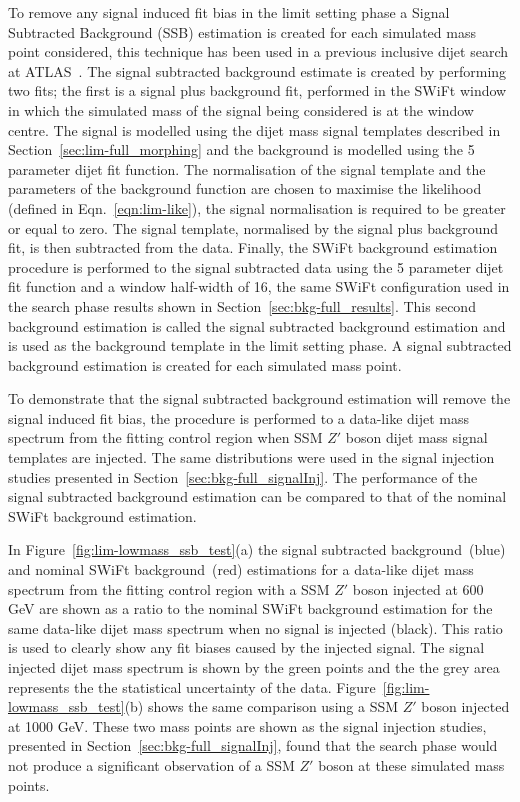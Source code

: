 To remove any signal induced fit bias in the limit setting phase a Signal Subtracted Background (SSB) estimation is
created for each simulated mass point considered, this technique has been used in a previous inclusive dijet search at ATLAS~\cite{dijet-mori17_paper}.
The signal subtracted background estimate is created by performing two fits;
the first is a signal plus background fit, performed in the SWiFt window
in which the simulated mass of the signal being considered is at the window centre.
The signal is modelled using the dijet mass signal templates described in Section~\ref{sec:lim-full_morphing}
and the background is modelled using the 5 parameter dijet fit function.
The normalisation of the signal template and the parameters of the background function are
chosen to maximise the likelihood (defined in Eqn.~\ref{eqn:lim-like}),
the signal normalisation is required to be greater or equal to zero.
The signal template, normalised by the signal plus background fit, is then subtracted from the data.
Finally, the SWiFt background estimation procedure is performed to the signal subtracted data using the 
5 parameter dijet fit function and a window half-width of 16, the same SWiFt configuration used in the search phase results shown in Section~\ref{sec:bkg-full_results}.
This second background estimation is called the signal subtracted background estimation and is used as the background template in the limit setting phase.
A signal subtracted background estimation is created for each simulated mass point.

To demonstrate that the signal subtracted background estimation will remove the signal induced fit bias,
the procedure is performed to a data-like dijet mass spectrum from the fitting control region when SSM $Z'$ boson dijet mass signal templates are injected.
The same distributions were used in the signal injection studies presented in Section~\ref{sec:bkg-full_signalInj}.
The performance of the signal subtracted background estimation can be compared to that of the nominal SWiFt background estimation.

In Figure~\ref{fig:lim-lowmass_ssb_test}(a) the signal subtracted background~(blue) and nominal SWiFt background~(red) estimations
for a data-like dijet mass spectrum from the fitting control region with a SSM $Z'$ boson injected at 600 GeV are
shown as a ratio to the nominal SWiFt background estimation for the same data-like dijet mass spectrum when no signal is injected (black).
This ratio is used to clearly show any fit biases caused by the injected signal.
The signal injected dijet mass spectrum is shown by the green points and the the grey area represents the the statistical uncertainty of the data.
Figure~\ref{fig:lim-lowmass_ssb_test}(b) shows the same comparison using a SSM $Z'$ boson injected at 1000 GeV.
These two mass points are shown as the signal injection studies, presented in Section~\ref{sec:bkg-full_signalInj},
found that the search phase would not produce a significant observation of a SSM $Z'$ boson at these simulated mass points. 

